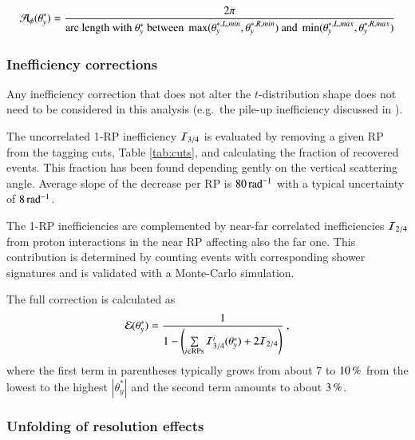 \begin{equation}
\label{acceptance}
{\cal A_{\phi}}(\theta_y^*) = {
	2\pi\over 
	\hbox{arc length with $\theta_y^*$ between } \max(\theta_y^{*,L,min}, \theta_y^{*,R,min}) \hbox{ and } \min(\theta_y^{*,L,max}, \theta_y^{*,R,max})
}
\end{equation}
\fi


\subsubsection{Inefficiency corrections}
\label{sec:ineff corr}

Any inefficiency correction that does not alter the $t$-distribution shape does not need to be considered in this analysis (e.g.~the pile-up inefficiency discussed in \cite{prl111}).

The uncorrelated 1-RP inefficiency ${\cal I}_{3/4}$ is evaluated by removing a given RP from the tagging cuts, Table \ref{tab:cuts}, and calculating the fraction of recovered events. This fraction has been found depending gently on the vertical scattering angle. Average slope of the decrease per RP is $80\,{\rm rad^{-1}}$ with a typical uncertainty of $8\,{\rm rad^{-1}}$.

The 1-RP inefficiencies are complemented by near-far correlated inefficiencies ${\cal I}_{2/4}$ from proton interactions in the near RP affecting also the far one. This contribution is determined by counting events with corresponding shower signatures and is validated with a Monte-Carlo simulation.

The full correction is calculated as
\begin{equation}
\label{efficiency}
	{\cal E}(\theta_y^*) = {1\over 1 - \left( \sum\limits_{i\in \rm RPs} {\cal I}^i_{3/4}(\theta_y^*) + 2 {\cal I}_{2/4} \right) } \ ,
\end{equation}
where the first term in parentheses typically grows from about $7$ to $10\,{\rm \%}$ from the lowest to the highest $|\theta_y^*|$ and the second term amounts to about $3\,{\rm \%}$.




\subsubsection{Unfolding of resolution effects}
\label{sec:unfolding}

